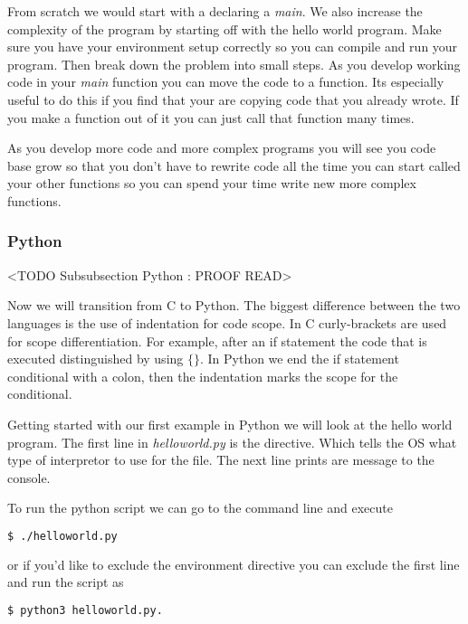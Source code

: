 From scratch we would start with a declaring a \emph{main}. We also increase the complexity of the program by starting off with the hello world program. Make sure you have your environment setup correctly so you can compile and run your program. Then break down the problem into small steps. As you develop working code in your \emph{main} function you can move the code to a function. Its especially useful to do this if you find that your are copying code that you already wrote. If you make a function out of it you can just call that function many times. 

As you develop more code and more complex programs you will see you code base grow so that you don't have to rewrite code all the time you can start called your other functions so you can spend your time write new more complex functions. 

\subsubsection{Python}
	<TODO Subsubsection  Python : PROOF READ>

Now we will transition from C to Python. The biggest difference between the two languages is the use of indentation for code scope. In C curly-brackets are used for scope differentiation. For example, after an if statement the code that is executed distinguished by using $\{\}$. In Python we end the if statement conditional with a colon, then the indentation marks the scope for the conditional. 

Getting started with our first example in Python we will look at the hello world program. The first line in \emph{helloworld.py} is the directive. Which tells the \ac{OS} what type of interpretor to use for the file. The next line prints are message to the console. 



To run the python script we can go to the command line and execute

\begin{lstlisting}[language=bash]
    $ ./helloworld.py
\end{lstlisting}

or if you'd like to exclude the environment directive you can exclude the first line and run the script as

\begin{lstlisting}[language=bash]
    $ python3 helloworld.py.
\end{lstlisting}

